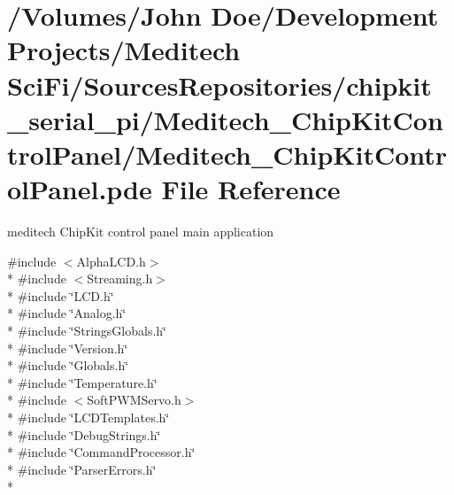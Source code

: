 \hypertarget{_meditech___chip_kit_control_panel_8pde}{\section{/\-Volumes/\-John Doe/\-Development Projects/\-Meditech Sci\-Fi/\-Sources\-Repositories/chipkit\-\_\-serial\-\_\-pi/\-Meditech\-\_\-\-Chip\-Kit\-Control\-Panel/\-Meditech\-\_\-\-Chip\-Kit\-Control\-Panel.pde File Reference}
\label{_meditech___chip_kit_control_panel_8pde}
}


meditech Chip\-Kit control panel main application  


{\ttfamily \#include $<$Alpha\-L\-C\-D.\-h$>$}\\*
{\ttfamily \#include $<$Streaming.\-h$>$}\\*
{\ttfamily \#include \char`\"{}L\-C\-D.\-h\char`\"{}}\\*
{\ttfamily \#include \char`\"{}Analog.\-h\char`\"{}}\\*
{\ttfamily \#include \char`\"{}Strings\-Globals.\-h\char`\"{}}\\*
{\ttfamily \#include \char`\"{}Version.\-h\char`\"{}}\\*
{\ttfamily \#include \char`\"{}Globals.\-h\char`\"{}}\\*
{\ttfamily \#include \char`\"{}Temperature.\-h\char`\"{}}\\*
{\ttfamily \#include $<$Soft\-P\-W\-M\-Servo.\-h$>$}\\*
{\ttfamily \#include \char`\"{}L\-C\-D\-Templates.\-h\char`\"{}}\\*
{\ttfamily \#include \char`\"{}Debug\-Strings.\-h\char`\"{}}\\*
{\ttfamily \#include \char`\"{}Command\-Processor.\-h\char`\"{}}\\*
{\ttfamily \#include \char`\"{}Parser\-Errors.\-h\char`\"{}}\\*
